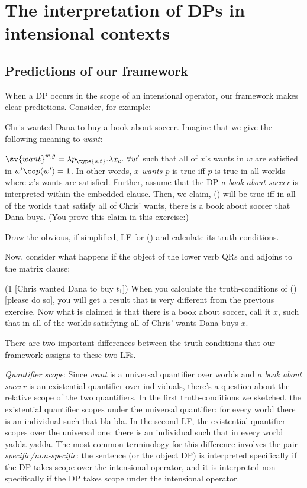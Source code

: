 \chapter{The interpretation of DPs in intensional contexts}


\minitoc

\section{Predictions of our framework}
\label{sec:predictions}

When a DP occurs in the scope of an intensional operator, our framework makes
clear predictions. Consider, for example:

\ex
Chris wanted Dana to buy a book about soccer.
\xe
%
Imagine that we give the following meaning to \emph{want}:

\ex
$\sv{want}^{w,g} = \lambda p_{\type{s,t}}.\lambda x_e.\ \forall w'$ such that
all of $x$'s wants in $w$ are satisfied in $w'\co p(w')=1$. 
\xe
%
In other words, \emph{$x$ wants $p$} is true iff $p$ is true in all worlds where
$x$'s wants are satisfied. Further, assume that the DP \emph{a book about
  soccer} is interpreted within the embedded clause. Then, we claim, (\blastx)
will be true iff in all of the worlds that satisfy all of Chris' wants, there is
a book about soccer that Dana buys. (You prove this claim in this exercise:)

\begin{exercise}
  Draw the obvious, if simplified, LF for (\blastx) and calculate its
  truth-conditions. \eex
\end{exercise}
%
Now, consider what happens if the object of the lower verb QRs and adjoins to
the matrix clause:

 (1 [Chris wanted Dana to buy $t_1$])
\xe
%
When you calculate the truth-conditions of (\lastx) [please do so], you will get
a result that is very different from the previous exercise. Now what is claimed
is that there is a book about soccer, call it $x$, such that in all of the
worlds satisfying all of Chris' wants Dana buys $x$.

There are two important differences between the truth-conditions that our framework
assigns to these two LFs.

\emph{Quantifier scope}: Since \emph{want} is a universal quantifier over
worlds and \emph{a book about soccer} is an existential quantifier over
individuals, there's a question about the relative scope of the two quantifiers.
In the first truth-conditions we sketched, the existential quantifier scopes
under the universal quantifier: for every world there is an individual such that
bla-bla. In the second LF, the existential quantifier scopes over the universal
one: there is an individual such that in every world yadda-yadda. The most
common terminology for this difference involves the pair
\emph{specific/non-specific}: the sentence (or the object DP) is interpreted
specifically if the DP takes scope over the intensional operator, and it is
interpreted non-specifically if the DP takes scope under the intensional operator.

